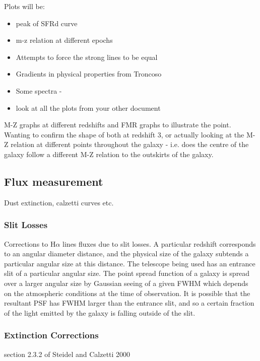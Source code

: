 \documentclass{literature}
\begin{document}
Plots will be: 

\begin{itemize}
	\item peak of SFRd curve 
	\item m-z relation at different epochs 
	\item Attempts to force the strong lines to be equal 
	\item Gradients in physical properties from Troncoso
	\item Some spectra -  
	\item look at all the plots from your other document 
\end{itemize}



M-Z graphs at different redshifts and FMR graphs to illustrate the point. Wanting to confirm the shape of both at redshift 3, or actually looking at the M-Z relation at different points throughout the galaxy - i.e. does the centre of the galaxy follow a different M-Z relation to the outskirts of the galaxy. 

\subsection{Flux measurement}
Dust extinction, calzetti curves etc. 

 

\subsubsection{Slit Losses}
Corrections to H$\alpha$ lines fluxes due to slit losses. A particular redshift corresponds to an angular diameter distance, and the physical size of the galaxy subtends a particular angular size at this distance. The telescope being used has an entrance slit of a particular angular size. The point spread function of a galaxy is spread over a larger angular size by Gaussian seeing of a given FWHM which depends on the atmospheric conditions at the time of observation. It is possible that the resultant PSF has FWHM larger than the entrance slit, and so a certain fraction of the light emitted by the galaxy is falling outside of the slit.     


\subsubsection{Extinction Corrections}
section 2.3.2 of Steidel and Calzetti 2000
\end{document}
